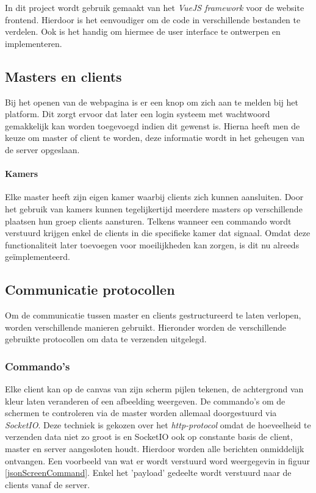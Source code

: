In dit project wordt gebruik gemaakt van het \textit{VueJS framework} voor de website frontend. Hierdoor is het eenvoudiger om de code in verschillende bestanden te verdelen. Ook is het handig om hiermee de user interface te ontwerpen en implementeren. 


\subsection{Masters en clients}
Bij het openen van de webpagina is er een knop om zich aan te melden bij het platform.
Dit zorgt ervoor dat later een login systeem met wachtwoord gemakkelijk kan worden toegevoegd indien dit gewenst is.
Hierna heeft men de keuze om master of client te worden, deze informatie wordt in het geheugen van de server opgeslaan. 

\paragraph{Kamers} Elke master heeft zijn eigen kamer waarbij clients zich kunnen aansluiten. Door het gebruik van kamers kunnen tegelijkertijd meerdere masters op verschillende plaatsen hun groep clients aansturen.  Telkens wanneer een commando wordt verstuurd krijgen enkel de clients in die specifieke kamer dat signaal. Omdat deze functionaliteit later toevoegen voor moeilijkheden kan zorgen, is dit nu alreeds geïmplementeerd.

\subsection{Communicatie protocollen}
Om de communicatie tussen master en clients gestructureerd te laten verlopen, worden verschillende manieren gebruikt.
Hieronder worden de verschillende gebruikte protocollen om data te verzenden uitgelegd.
\subsubsection{Commando's}
Elke client kan op de canvas van zijn scherm pijlen tekenen, de achtergrond van kleur laten veranderen of een afbeelding weergeven. De commando's om de schermen te controleren via de master worden allemaal doorgestuurd via \textit{SocketIO}. Deze techniek is gekozen over het \textit{http-protocol} omdat de hoeveelheid te verzenden data niet zo groot is en SocketIO ook op constante basis de client, master en server aangesloten houdt. Hierdoor worden alle berichten onmiddelijk ontvangen. Een voorbeeld van wat er wordt verstuurd word weergegevin in figuur \ref{jsonScreenCommand}.
Enkel het 'payload' gedeelte wordt verstuurd naar de clients vanaf de server.

